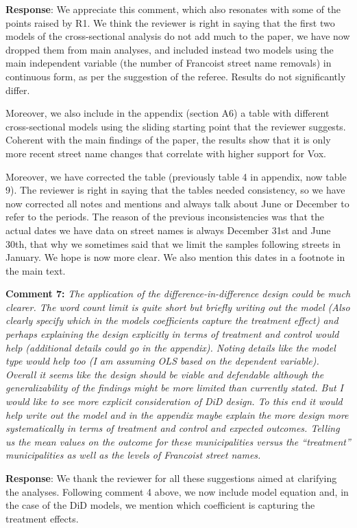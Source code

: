 \documentclass[12pt, a4paper, notitlepage]{article}
\begin{document}
\textbf{Response}: We appreciate this comment, which also resonates with some of the points raised by R1. We think the reviewer is right in saying that the first two models of the cross-sectional analysis do not add much to the paper, we have now dropped them from main analyses, and included instead two models using the main independent variable (the number of Francoist street name removals) in continuous form, as per the suggestion of the referee. Results do not significantly differ.

Moreover, we also include in the appendix (section A6) a table with different cross-sectional models using the sliding starting point that the reviewer suggests. Coherent with the main findings of the paper, the results show that it is only more recent street name changes that correlate with higher support for Vox.

Moreover, we have corrected the table (previously table 4 in appendix, now table 9). The reviewer is right in saying that the tables needed consistency, so we have now corrected all notes and mentions and always talk about June or December to refer to the periods. The reason of the previous inconsistencies was that the actual dates we have data on street names is always December 31st and June 30th, that why we sometimes said that we limit the samples following streets in January. We hope is now more clear. We also mention this dates in a footnote in the main text.

\textbf{Comment 7:} \textit{The application of the difference-in-difference design could be much clearer. The word count limit is quite short but briefly writing out the model (Also clearly specify which in the models coefficients capture the treatment effect) and perhaps explaining the design explicitly in terms of treatment and control would help (additional details could go in the appendix). Noting details like the model type would help too (I am assuming OLS based on the dependent variable). Overall it seems like the design should be viable and defendable although the generalizability of the findings might be more limited than currently stated. But I would like to see more explicit consideration of DiD design. To this end it would help write out the model and in the appendix maybe explain the more design more systematically in terms of treatment and control and expected outcomes. Telling us the mean values on the outcome for these municipalities versus the “treatment” municipalities as well as the levels of Francoist street names.}

\textbf{Response}: We thank the reviewer for all these suggestions aimed at clarifying the analyses. Following comment 4 above, we now include model equation and, in the case of the DiD models, we mention which coefficient is capturing the treatment effects.
\end{document}
